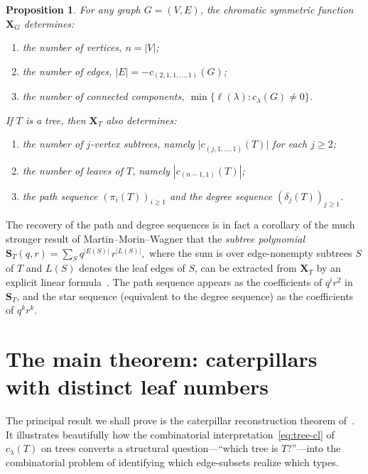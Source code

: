 \documentclass[11pt]{article}
\newtheorem{proposition}[theorem]{Proposition}
\theoremstyle{definition}
\newcommand{\X}{\mathbf{X}}
\newcommand{\St}{\mathbf{S}}
\begin{document}
\begin{proposition}\label{prop:invariants}
For any graph $G=(V,E)$, the chromatic symmetric function $\X_G$
determines:
\begin{enumerate}[label=\textup{(\roman*)}]
   \item the number of vertices, $n=|V|$;
   \item the number of edges, $|E| = -c_{(2,1,1,\ldots,1)}(G)$;
   \item the number of connected components,
         $\min\{\ell(\lambda) : c_\lambda(G)\neq 0\}$.
\end{enumerate}
If $T$ is a tree, then $\X_T$ also determines:
\begin{enumerate}[label=\textup{(\roman*)},resume]
   \item the number of $j$-vertex subtrees, namely
         $\bigl|c_{(j,1,\ldots,1)}(T)\bigr|$ for each $j\geq 2$;
   \item the number of leaves of $T$, namely
         $|c_{(n-1,1)}(T)|$;
   \item the path sequence $(\pi_i(T))_{i\geq 1}$ and the degree
         sequence $(\delta_j(T))_{j\geq 1}$.
\end{enumerate}
\end{proposition}

The recovery of the path and degree sequences is in fact a corollary of
the much stronger result of Martin--Morin--Wagner that the
\emph{subtree polynomial}
\(
   \St_T(q,r) = \sum_S q^{|E(S)|}\,r^{|L(S)|},
\)
where the sum is over edge-nonempty subtrees $S$ of $T$ and $L(S)$
denotes the leaf edges of $S$, can be extracted from $\X_T$ by an
explicit linear formula~\cite[Thm.~1]{MMW}.  The path sequence appears
as the coefficients of $q^i r^2$ in $\St_T$, and the star sequence
(equivalent to the degree sequence) as the coefficients of $q^k r^k$.

\section{The main theorem: caterpillars with distinct leaf numbers}\label{sec:thm}

The principal result we shall prove is the caterpillar reconstruction
theorem of~\cite[Thm.~11]{MMW}.  It illustrates beautifully how the
combinatorial interpretation~\eqref{eq:tree-cl} of $c_\lambda(T)$ on
trees converts a structural question---``which tree is $T$?''---into
the combinatorial problem of identifying which edge-subsets realize
which types.
\end{document}
